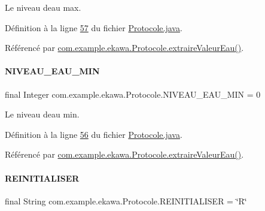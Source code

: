 Le niveau d\textquotesingle{}eau max. 



Définition à la ligne \hyperlink{_protocole_8java_source_l00057}{57} du fichier \hyperlink{_protocole_8java_source}{Protocole.\+java}.



Référencé par \hyperlink{_protocole_8java_source_l00299}{com.\+example.\+ekawa.\+Protocole.\+extraire\+Valeur\+Eau()}.

\mbox{\label{classcom_1_1example_1_1ekawa_1_1_protocole_abba816d4dfe88be3a873669f2056aecc}} 
\paragraph{\texorpdfstring{N\+I\+V\+E\+A\+U\+\_\+\+E\+A\+U\+\_\+\+M\+IN}{NIVEAU\_EAU\_MIN}}
{\footnotesize\ttfamily final Integer com.\+example.\+ekawa.\+Protocole.\+N\+I\+V\+E\+A\+U\+\_\+\+E\+A\+U\+\_\+\+M\+IN = 0\hspace{0.3cm}{\ttfamily [static]}}



Le niveau d\textquotesingle{}eau min. 



Définition à la ligne \hyperlink{_protocole_8java_source_l00056}{56} du fichier \hyperlink{_protocole_8java_source}{Protocole.\+java}.



Référencé par \hyperlink{_protocole_8java_source_l00299}{com.\+example.\+ekawa.\+Protocole.\+extraire\+Valeur\+Eau()}.

\mbox{\label{classcom_1_1example_1_1ekawa_1_1_protocole_add67f8989ac6672f498b8c9f085cd445}} 
\paragraph{\texorpdfstring{R\+E\+I\+N\+I\+T\+I\+A\+L\+I\+S\+ER}{REINITIALISER}}
{\footnotesize\ttfamily final String com.\+example.\+ekawa.\+Protocole.\+R\+E\+I\+N\+I\+T\+I\+A\+L\+I\+S\+ER = \char`\"{}R\char`\"{}\hspace{0.3cm}{\ttfamily [static]}}



